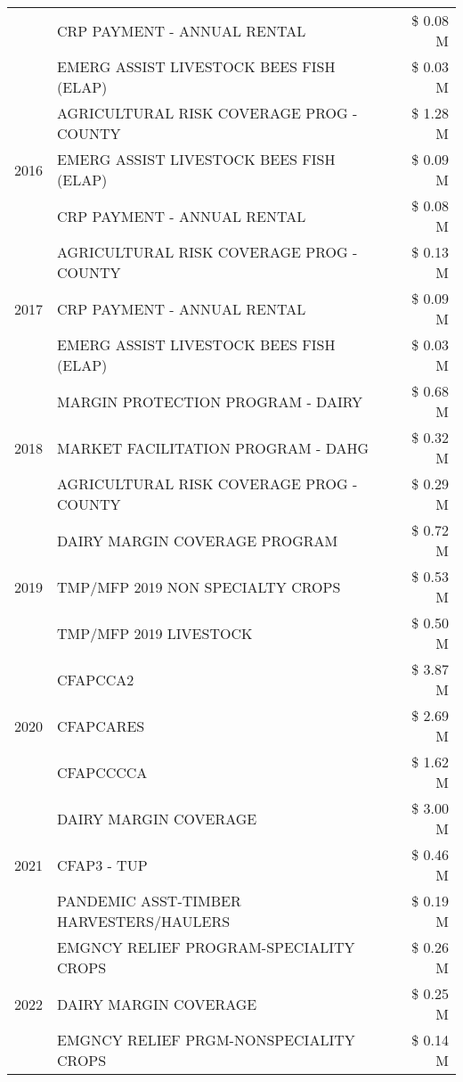 \begin{tabular}{llr}
 & CRP PAYMENT - ANNUAL RENTAL & \$ 0.08 M \\
 & EMERG ASSIST LIVESTOCK BEES FISH (ELAP) & \$ 0.03 M \\
\cline{1-3}
\multirow[t]{3}{*}{2016} & AGRICULTURAL RISK COVERAGE PROG - COUNTY & \$ 1.28 M \\
 & EMERG ASSIST LIVESTOCK BEES FISH (ELAP) & \$ 0.09 M \\
 & CRP PAYMENT - ANNUAL RENTAL & \$ 0.08 M \\
\cline{1-3}
\multirow[t]{3}{*}{2017} & AGRICULTURAL RISK COVERAGE PROG - COUNTY & \$ 0.13 M \\
 & CRP PAYMENT - ANNUAL RENTAL & \$ 0.09 M \\
 & EMERG ASSIST LIVESTOCK BEES FISH (ELAP) & \$ 0.03 M \\
\cline{1-3}
\multirow[t]{3}{*}{2018} & MARGIN PROTECTION PROGRAM - DAIRY & \$ 0.68 M \\
 & MARKET FACILITATION PROGRAM - DAHG & \$ 0.32 M \\
 & AGRICULTURAL RISK COVERAGE PROG - COUNTY & \$ 0.29 M \\
\cline{1-3}
\multirow[t]{3}{*}{2019} & DAIRY MARGIN COVERAGE PROGRAM & \$ 0.72 M \\
 & TMP/MFP 2019 NON SPECIALTY CROPS & \$ 0.53 M \\
 & TMP/MFP 2019 LIVESTOCK & \$ 0.50 M \\
\cline{1-3}
\multirow[t]{3}{*}{2020} & CFAPCCA2 & \$ 3.87 M \\
 & CFAPCARES & \$ 2.69 M \\
 & CFAPCCCCA & \$ 1.62 M \\
\cline{1-3}
\multirow[t]{3}{*}{2021} & DAIRY MARGIN COVERAGE & \$ 3.00 M \\
 & CFAP3 - TUP & \$ 0.46 M \\
 & PANDEMIC ASST-TIMBER HARVESTERS/HAULERS & \$ 0.19 M \\
\cline{1-3}
\multirow[t]{3}{*}{2022} & EMGNCY RELIEF PROGRAM-SPECIALITY CROPS & \$ 0.26 M \\
 & DAIRY MARGIN COVERAGE & \$ 0.25 M \\
 & EMGNCY RELIEF PRGM-NONSPECIALITY CROPS & \$ 0.14 M \\
\cline{1-3}
\bottomrule
\end{tabular}
